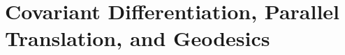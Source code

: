 \documentclass[Shifrin_Solutions_Spring_2018]{subfiles}
\begin{document}
\section{Covariant Differentiation, Parallel Translation, and Geodesics}

\begin{exercise}

\end{exercise}


\begin{exercise}

\end{exercise}


\begin{exercise}

\end{exercise}


\begin{exercise}

\end{exercise}

\begin{exercise}

\end{exercise}


\begin{exercise}

\end{exercise}


\begin{exercise}

\end{exercise}


\begin{exercise}

\end{exercise}

\begin{exercise}

\end{exercise}


\begin{exercise}

\end{exercise}


\begin{exercise}

\end{exercise}


\begin{exercise}

\end{exercise}
\end{document}
